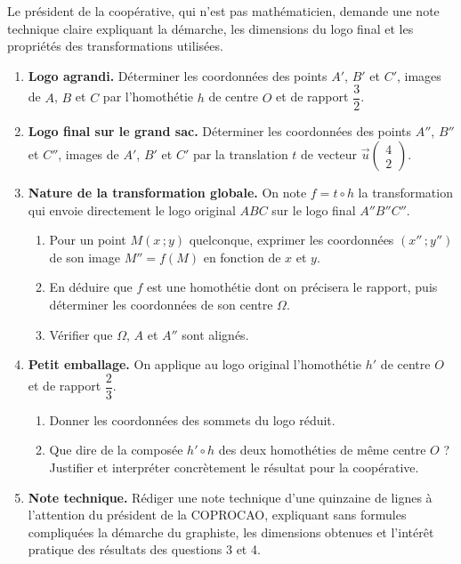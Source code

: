 \documentclass[11pt]{article}
\newcounter{popsec}
\newcounter{popsub}
\newcommand{\courssub}[1]{%
  \stepcounter{popsub}%
  \par\vspace{9pt}\noindent{\popxbold\fontsize{11.5}{13}\selectfont\color{popink}{\color{poporange}\thepopsec.\thepopsub}\hspace{6pt}#1}\par\nopagebreak\vspace{4pt}
}
\begin{document}
Le président de la coopérative, qui n'est pas mathématicien, demande une note technique claire expliquant la démarche, les dimensions du logo final et les propriétés des transformations utilisées.

\courssub{Consignes}

\begin{enumerate}
\item \textbf{Logo agrandi.} Déterminer les coordonnées des points $A'$, $B'$ et $C'$, images de $A$, $B$ et $C$ par l'homothétie $h$ de centre $O$ et de rapport $\dfrac{3}{2}$.
\item \textbf{Logo final sur le grand sac.} Déterminer les coordonnées des points $A''$, $B''$ et $C''$, images de $A'$, $B'$ et $C'$ par la translation $t$ de vecteur $\vec{u}\begin{pmatrix} 4 \\ 2 \end{pmatrix}$.
\item \textbf{Nature de la transformation globale.} On note $f = t \circ h$ la transformation qui envoie directement le logo original $ABC$ sur le logo final $A''B''C''$.
\begin{enumerate}
\item Pour un point $M(x\,;y)$ quelconque, exprimer les coordonnées $(x''\,;y'')$ de son image $M'' = f(M)$ en fonction de $x$ et $y$.
\item En déduire que $f$ est une homothétie dont on précisera le rapport, puis déterminer les coordonnées de son centre $\Omega$.
\item Vérifier que $\Omega$, $A$ et $A''$ sont alignés.
\end{enumerate}
\item \textbf{Petit emballage.} On applique au logo original l'homothétie $h'$ de centre $O$ et de rapport $\dfrac{2}{3}$.
\begin{enumerate}
\item Donner les coordonnées des sommets du logo réduit.
\item Que dire de la composée $h' \circ h$ des deux homothéties de même centre $O$ ? Justifier et interpréter concrètement le résultat pour la coopérative.
\end{enumerate}
\item \textbf{Note technique.} Rédiger une note technique d'une quinzaine de lignes à l'attention du président de la COPROCAO, expliquant sans formules compliquées la démarche du graphiste, les dimensions obtenues et l'intérêt pratique des résultats des questions 3 et 4.
\end{enumerate}
\end{document}
